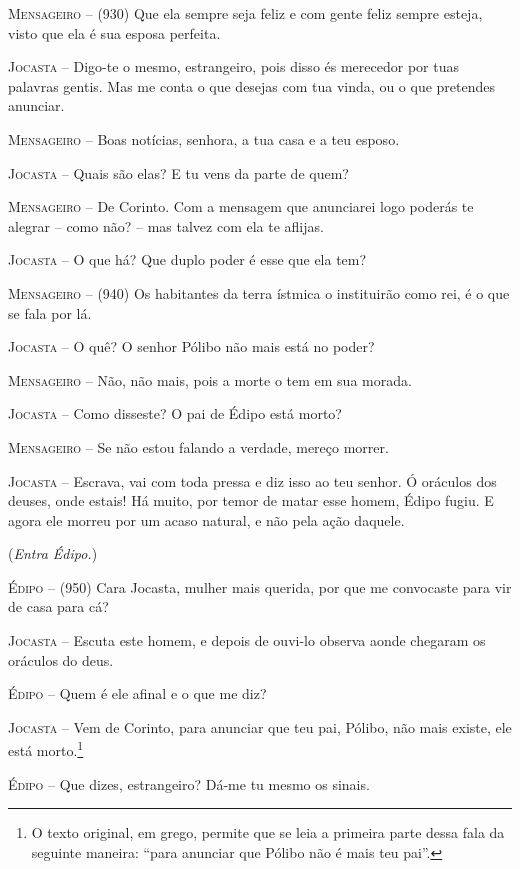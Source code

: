 \textsc{Mensageiro} --   (930) Que ela sempre seja feliz e com gente feliz sempre esteja, visto
que ela é sua esposa perfeita.

\textsc{Jocasta} --   Digo-te o mesmo, estrangeiro, pois disso és merecedor por tuas palavras
gentis. Mas me conta o que desejas com tua vinda, ou o que pretendes
anunciar.

\textsc{Mensageiro} --   Boas notícias, senhora, a tua casa e a teu esposo.

\textsc{Jocasta} --   Quais são elas? E tu vens da parte de quem?

\textsc{Mensageiro} --   De Corinto. Com a mensagem que anunciarei logo poderás te alegrar --
como não? -- mas talvez com ela te aflijas.

\textsc{Jocasta} --   O que há? Que duplo poder é esse que ela tem?

\textsc{Mensageiro} --   (940) Os habitantes da terra ístmica o instituirão como rei, é o que se
fala por lá.

\textsc{Jocasta} --   O quê? O senhor Pólibo não mais está no poder?

\textsc{Mensageiro} --   Não, não mais, pois a morte o tem em sua morada.

\textsc{Jocasta} --   Como disseste? O pai de Édipo está morto?

\textsc{Mensageiro} --   Se não estou falando a verdade, mereço morrer.

\textsc{Jocasta} --   Escrava, vai com toda pressa e diz isso ao teu senhor. Ó oráculos dos
deuses, onde estais! Há muito, por temor de matar esse homem, Édipo
fugiu. E agora ele morreu por um acaso natural, e não pela ação daquele.

(\emph{Entra Édipo.})

\textsc{Édipo} --   (950) Cara Jocasta, mulher mais querida, por que me convocaste para vir
de casa para cá?

\textsc{Jocasta} --   Escuta este homem, e depois de ouvi-lo observa aonde chegaram os
oráculos do deus.

\textsc{Édipo} --   Quem é ele afinal e o que me diz?

\textsc{Jocasta} --   Vem de Corinto, para anunciar que teu pai, Pólibo, não mais existe, ele
está morto.\footnote{O texto original, em grego, permite que se leia a
  primeira parte dessa fala da seguinte maneira: ``para anunciar
  que Pólibo não é mais teu pai''.}

\textsc{Édipo} --   Que dizes, estrangeiro? Dá-me tu mesmo os sinais.

